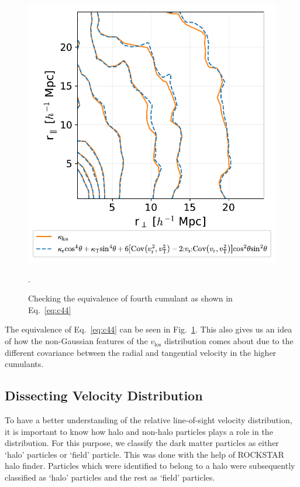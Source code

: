 \documentclass[a4paper,fleqn,usenatbib]{mnras}
\begin{document}
	\begin{figure}
		\centering
		\includegraphics[scale=0.7]{fourth_cumulants}
		\caption{Checking the equivalence of fourth cumulant as shown in Eq.~\ref{eq:c44}}.
		\label{fig:4cum}
	\end{figure}
	\noindent The equivalence of Eq.~\ref{eq:c44} can be seen in Fig.~\ref{fig:4cum}. This also gives us an idea of how the non-Gaussian features of the $v_{\mathrm{los}}$ distribution comes about due to the different covariance between the radial and tangential velocity in the higher cumulants.
	
	\subsection{Dissecting Velocity Distribution}
	
	To have a better understanding of the relative line-of-sight velocity distribution, it is important to know how halo and non-halo particles plays a role in the distribution. For this purpose, we classify the dark matter particles as either `halo' particles or `field' particle. This was done with the help of ROCKSTAR halo finder. Particles which were identified to belong to a halo were subsequently classified as `halo' particles and the rest as `field' particles.  
	
\end{document}
